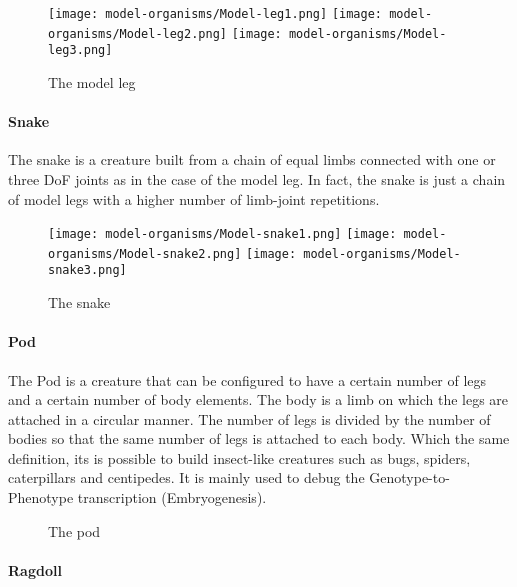 \documentclass[main]{subfiles}
\begin{document}
\begin{figure}[!h]
\centering
\texttt{[image: model-organisms/Model-leg1.png]}
\texttt{[image: model-organisms/Model-leg2.png]}
\texttt{[image: model-organisms/Model-leg3.png]}
\caption[The model leg]{The model leg}
\label{figure:model-leg}
\end{figure}

\paragraph{Snake}

The snake is a creature built from a chain of equal limbs connected with one or three DoF joints as in the case of the model leg. In fact, the snake is just a chain of model legs with a higher number of limb-joint repetitions.

\begin{figure}[!h]
\centering
\texttt{[image: model-organisms/Model-snake1.png]}
\texttt{[image: model-organisms/Model-snake2.png]}
\texttt{[image: model-organisms/Model-snake3.png]}
\caption[The snake]{The snake}
\label{figure:snake}
\end{figure}


\paragraph{Pod}

The Pod is a creature that can be configured to have a certain number of legs and a certain number of body elements. The body is a limb on which the legs are attached in a circular manner. The number of legs is divided by the number of bodies so that the same number of legs is attached to each body. Which the same definition, its is possible to build insect-like creatures such as bugs, spiders, caterpillars and centipedes. It is mainly used to debug the Genotype-to-Phenotype transcription (Embryogenesis).

\begin{figure}[!h]
\centering
{}
\caption[The pod]{The pod}
\label{figure:pod}
\end{figure}


\paragraph{Ragdoll}
\end{document}
